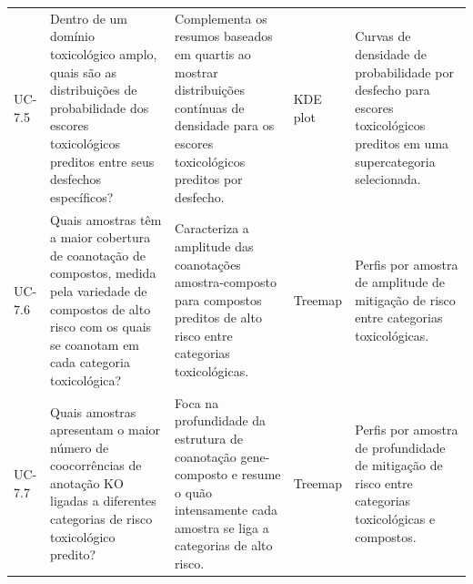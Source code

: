 \begin{landscape}
\begin{longtable}{>{\raggedright\arraybackslash}p{1.1cm} >{\raggedright\arraybackslash}p{5.0cm} >{\raggedright\arraybackslash}p{7.8cm} >{\raggedright\arraybackslash}p{4.2cm} >{\raggedright\arraybackslash}p{5.3cm}}
UC-7.5 & Dentro de um domínio toxicológico amplo, quais são as distribuições de probabilidade dos escores toxicológicos preditos entre seus desfechos específicos? & Complementa os resumos baseados em quartis ao mostrar distribuições contínuas de densidade para os escores toxicológicos preditos por desfecho. & KDE plot & Curvas de densidade de probabilidade por desfecho para escores toxicológicos preditos em uma supercategoria selecionada. \\
UC-7.6 & Quais amostras têm a maior cobertura de coanotação de compostos, medida pela variedade de compostos de alto risco com os quais se coanotam em cada categoria toxicológica? & Caracteriza a amplitude das coanotações amostra-composto para compostos preditos de alto risco entre categorias toxicológicas. & Treemap & Perfis por amostra de amplitude de mitigação de risco entre categorias toxicológicas. \\
UC-7.7 & Quais amostras apresentam o maior número de coocorrências de anotação KO ligadas a diferentes categorias de risco toxicológico predito? & Foca na profundidade da estrutura de coanotação gene-composto e resume o quão intensamente cada amostra se liga a categorias de alto risco. & Treemap & Perfis por amostra de profundidade de mitigação de risco entre categorias toxicológicas e compostos. \\
\end{longtable}
\end{landscape}
\clearpage


